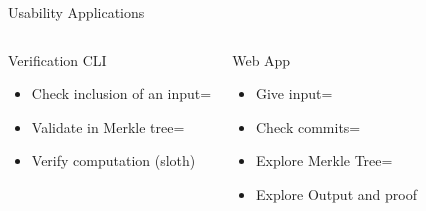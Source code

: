 \begin{frame}[t]{Usability Applications}
    \begin{columns}[T,onlytextwidth]

        \begin{block}{Verification CLI}
            \small
            \vspace{-.5em}
            \begin{itemize}
                \item Check inclusion of an input\itemsep=\smallerspacing
                \item Validate in Merkle tree\itemsep=\smallerspacing
                \item Verify computation (sloth)
            \end{itemize}
            \vspace{-.5em}
        \end{block}


        \pause


        \begin{block}{Web App}
            \small
            \vspace{-.5em}
            \begin{itemize}
                \item Give input\itemsep=\smallerspacing
                \item Check commits\itemsep=\smallerspacing
                \item Explore Merkle Tree\itemsep=\smallerspacing
                \item Explore Output and proof
            \end{itemize}
            \vspace{-.5em}
        \end{block}


\end{columns}
\end{frame}
